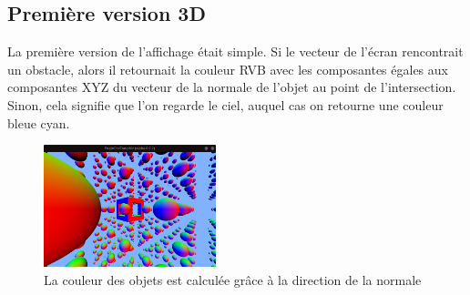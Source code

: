\subsection{Première version 3D}
La première version de l'affichage était simple. Si le vecteur de l'écran rencontrait un obstacle, alors il retournait la couleur RVB avec les composantes égales aux composantes XYZ du vecteur de la normale de l'objet au point de l'intersection. Sinon, cela signifie que l'on regarde le ciel, auquel cas on retourne une couleur bleue cyan.
\begin{figure}[h]
    \centering
    \includegraphics[width=5cm]{images/screens/couleurnormale.png}
    \caption{La couleur des objets est calculée grâce à la direction de la normale}
    \label{fig:firstpreview}
\end{figure}